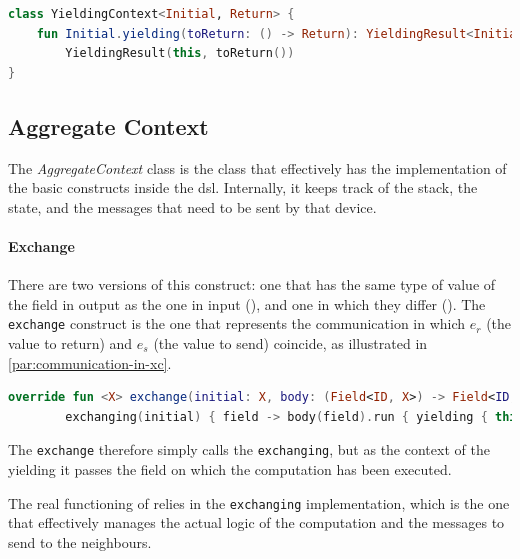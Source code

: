 \begin{lstlisting}[language=kt,label={lst:yieldingcontext}, caption={The signature of the \texttt{yielding context} class.}]
class YieldingContext<Initial, Return> {
    fun Initial.yielding(toReturn: () -> Return): YieldingResult<Initial, Return> =
        YieldingResult(this, toReturn())
}
\end{lstlisting}

\subsection{Aggregate Context}
\label{subsec:aggregate-context}

The \emph{AggregateContext} class is the class that effectively has the implementation of the basic constructs inside the \ac{dsl}.
Internally, it keeps track of the {stack}, the state, and the messages that need to be sent by that device.

\paragraph{Exchange}
There are two versions of this construct: one that has the same type of value of the field in output as the one in input (),
and one in which they differ ().
The \texttt{exchange} construct is the one that represents the communication in which $e_r$ (the value to return)
and $e_s$ (the value to send) coincide, as illustrated in \ref{par:communication-in-xc}.

\begin{lstlisting}[language=kt,label={lst:exchangeImpl},caption={The implementation of the \texttt{exchange} function.}]
override fun <X> exchange(initial: X, body: (Field<ID, X>) -> Field<ID, X>): Field<ID, X> =
        exchanging(initial) { field -> body(field).run { yielding { this } } }
\end{lstlisting}

The \texttt{exchange} therefore simply calls the \texttt{exchanging}, but as the context of the yielding it passes the
field on which the computation has been executed.

The real functioning of \xc{} relies in the \texttt{exchanging} implementation, which is the one that effectively manages
the actual logic of the computation and the messages to send to the neighbours.


